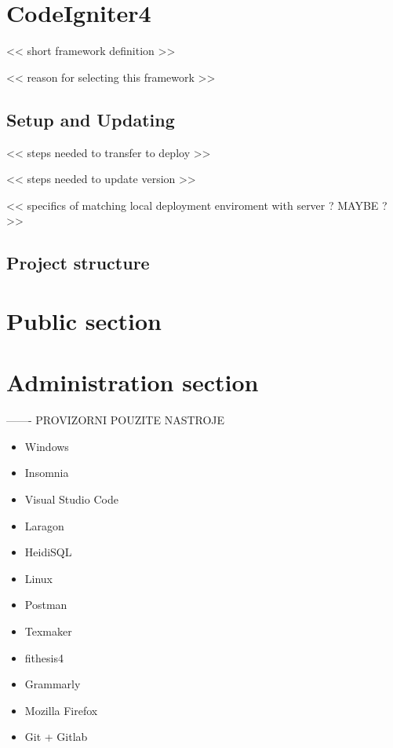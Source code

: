 \documentclass[
  digital,     %
  oneside,     %
  nosansbold,  %
  colorbold, %
  lof,         %
  lot,         %
]{fithesis4}
\begin{document}
\section{CodeIgniter4}

<< short framework definition >>

<< reason for selecting this framework >>

\subsection{Setup and Updating}

<< steps needed to transfer to deploy >>

<< steps needed to update version >>

<< specifics of matching local deployment enviroment with server ? MAYBE ?>>

\subsection{Project structure}

\section{Public section}

\section{Administration section}

\newpage

------- PROVIZORNI POUZITE NASTROJE

\begin{itemize}
	\item Windows
	\item Insomnia
	\item Visual Studio Code
	\item Laragon
	\item HeidiSQL
	\item Linux
	\item Postman
	\item Texmaker
	\item fithesis4
	\item Grammarly
	\item Mozilla Firefox
	\item Git + Gitlab
\end{itemize}

\newpage
\end{document}
